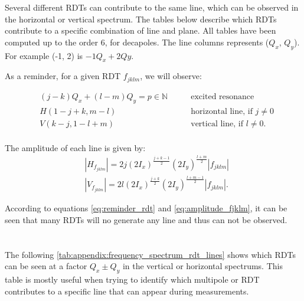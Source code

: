 Several different RDTs can contribute to the same line, which can be observed in the horizontal or vertical spectrum. The tables below describe which RDTs contribute to a specific combination of line and plane.
All tables have been computed up to the order 6, for decapoles.
The line columns represents ($Q_x$, $Q_y$). For example (-1, 2) is \(-1Q_x + 2Qy\).

As a reminder, for a given RDT $f_{jklm}$, we will observe:

\begin{equation}\begin{aligned}
& (j-k)Q_x + (l-m)Q_y = p \in \mathbb{N} \quad\quad& \mbox{excited resonance}\\
& H(1 - j + k, m - l) \quad\quad& \mbox{horizontal line, if } j \ne 0 \\
& V(k - j, 1 - l + m) \quad\quad& \mbox{vertical line, if } l \ne 0. \\
\end{aligned}
\label{eq:reminder_rdt}
\end{equation}

The amplitude of each line is given by:
\begin{equation}
    \begin{aligned}
    &|H_{f_{jklm}}| = 2 j (2 I_x)^\frac{j+k-1}{2} (2 I_y)^\frac{l+m}{2} |f_{jklm}| \\
    &|V_{f_{jklm}}| = 2 l (2 I_x)^\frac{j+k}{2} (2 I_y)^\frac{l+m-1}{2} |f_{jklm}|.
    \label{eq:amplitude_fjklm}
    \end{aligned}
\end{equation}

According to equations \ref{eq:reminder_rdt} and \ref{eq:amplitude_fjklm}, it can be seen that many RDTs will no generate any line and thus can not be observed.



\section{}

The following \cref{tab:appendix:frequency_spectrum_rdt_lines} shows which RDTs can be seen at a 
factor $Q_x \pm Q_y$ in the vertical or horizontal spectrums. This table is mostly useful when
trying to identify which multipole or RDT contributes to a specific line that can appear during 
measurements.

